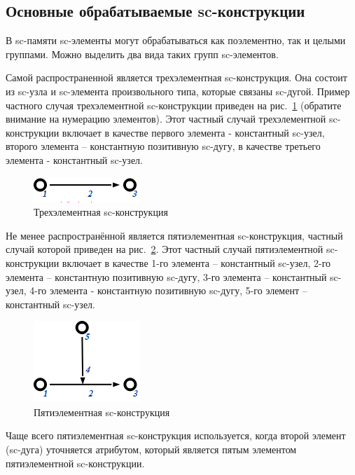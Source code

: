\subsection{Основные обрабатываемые sc-конструкции}

В sc-памяти sc-элементы могут обрабатываться как поэлементно, так и
целыми группами. Можно выделить два вида таких групп sc-элементов.

Самой распространенной является трехэлементная sc-конструкция. Она
состоит из sc-узла и sc-элемента произвольного типа, которые связаны
sc-дугой. Пример частного случая трехэлементной sc-конструкции
приведен на рис.~\ref{fig:3_sc_constr} (обратите внимание на нумерацию
элементов). Этот частный случай трехэлементной sc-конструкции включает
в качестве первого элемента - константный sc-узел, второго элемента –
константную позитивную sc-дугу, в качестве третьего элемента -
константный sc-узел.

\begin{figure}[h!]
  \centering
  \includegraphics{images/4/3_sc_constr}
  \caption{Трехэлементная sc-конструкция}
  \label{fig:3_sc_constr}
\end{figure}

Не менее распространённой является пятиэлементная sc-конструкция,
частный случай которой приведен на рис.~\ref{fig:5_sc_constr}. Этот
частный случай пятиэлементной sc-конструкции включает в качестве 1-го
элемента – константный sc-узел, 2-го элемента – константную позитивную
sc-дугу, 3-го элемента – константный sc-узел, 4-го элемента -
константную позитивную sc-дугу, 5-го элемент – константный sc-узел.

\begin{figure}[h!]
  \centering
  \includegraphics{images/4/5_sc_constr}
  \caption{Пятиэлементная sc-конструкция}
  \label{fig:5_sc_constr}
\end{figure}

Чаще всего пятиэлементная sc-конструкция используется, когда второй
элемент (sc-дуга) уточняется атрибутом, который является пятым
элементом пятиэлементной sc-конструкции.

